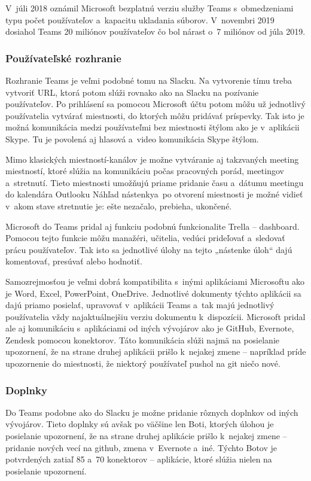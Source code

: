 \indent V júli 2018 oznámil Microsoft bezplatnú verziu služby Teams s obmedzeniami typu počet používateľov a kapacitu ukladania súborov. V novembri 2019 dosiahol Teams 20 miliónov používateľov čo bol nárast o 7 miliónov od júla 2019. 
\subsubsection{Používateľské rozhranie}
\indent Rozhranie Teams je veľmi podobné tomu na Slacku. Na vytvorenie tímu treba vytvoriť URL, ktorá potom slúži rovnako ako na Slacku na pozívanie používateľov. Po prihlásení sa pomocou Microsoft účtu potom môžu už jednotlivý používatelia vytvárať miestnosti, do ktorých môžu pridávať príspevky. Tak isto je možná komunikácia medzi používateľmi bez miestnosti štýlom ako je v aplikácii Skype. Tu je povolená aj hlasová a video komunikácia Skype štýlom. 

\indent Mimo klasických miestností-kanálov je možne vytváranie aj takzvaných meeting miestností, ktoré slúžia na komunikáciu počas pracovných porád, meetingov a stretnutí. Tieto miestnosti umožňujú priame pridanie času a dátumu meetingu do kalendára Outlooku Náhľad nástenkya po otvorení miestnosti je možné vidieť v akom stave stretnutie je: ešte nezačalo, prebieha, ukončené. 

\indent Microsoft do Teams pridal aj funkciu podobnú funkcionalite Trella – dashboard. Pomocou tejto funkcie môžu manažéri, učitelia, vedúci prideľovať a sledovať prácu používateľov. Tak isto sa jednotlivé úlohy na tejto „nástenke úloh“ dajú komentovať, presúvať alebo hodnotiť.

\indent Samozrejmosťou je veľmi dobrá kompatibilita s inými aplikáciami Microsoftu ako je Word, Excel, PowerPoint, OneDrive. Jednotlivé dokumenty týchto aplikácii sa dajú priamo posielať, upravovať v aplikácii Teams a tak majú jednotlivý používatelia vždy najaktuálnejšiu verziu dokumentu k dispozícii. Microsoft pridal ale aj komunikáciu s aplikáciami od iných vývojárov ako je GitHub, Evernote, Zendesk pomocou konektorov. Táto komunikácia slúži najmä na posielanie upozornení, že na strane druhej aplikácii prišlo k nejakej zmene – napríklad príde upozornenie do miestnosti, že niektorý používateľ pushol na git niečo nové.  
\subsubsection{Doplnky}
\indent Do Teams podobne ako do Slacku je možne pridanie rôznych doplnkov od iných vývojárov. Tieto doplnky sú avšak po väčšine len Boti, ktorých úlohou je posielanie upozornení, že na strane druhej aplikácie prišlo k nejakej zmene – pridanie nových vecí na github, zmena v Evernote a iné. Týchto Botov je potvrdených zatiaľ 85 a 70 konektorov – aplikácie, ktoré slúžia nielen na posielanie upozornení. 

